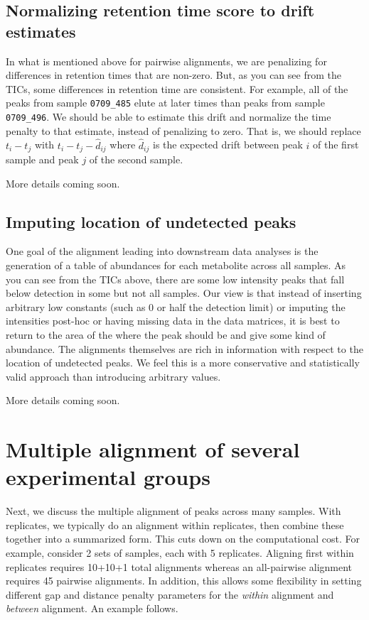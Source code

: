 \documentclass{article}\usepackage[]{graphicx}\usepackage[]{color}
\begin{document}
\subsection{Normalizing retention time score to drift estimates}
In what is mentioned above for pairwise alignments, we are penalizing
for differences in retention times that are non-zero. But, as you can
see from the TICs, some differences in retention time are
consistent. For example, all of the peaks from sample
\texttt{0709\_485} elute at later times than peaks from sample
\texttt{0709\_496}. We should be able to estimate this drift and
normalize the time penalty to that estimate, instead of penalizing to
zero. That is, we should replace $t_i-t_j$ with $t_i-t_j-\hat{d}_{ij}$
where $\hat{d}_{ij}$ is the expected drift between peak $i$ of the
first sample and peak $j$ of the second sample. 

More details coming soon.


\subsection{Imputing location of undetected peaks}
One goal of the alignment leading into downstream data analyses is the
generation of a table of abundances for each metabolite across all
samples. As you can see from the TICs above, there are some low
intensity peaks that fall below detection in some but not all
samples. Our view is that instead of inserting arbitrary low constants
(such as 0 or half the detection limit) or imputing the intensities
post-hoc or having missing data in the data matrices, it is best to
return to the area of the where the peak should be and give some kind
of abundance. The alignments themselves are rich in information with
respect to the location of undetected peaks. We feel this is a more
conservative and statistically valid approach than introducing
arbitrary values. 

More details coming soon.


\section{Multiple alignment of several experimental groups}
Next, we discuss the multiple alignment of peaks across many
samples. With replicates, we typically do an alignment within
replicates, then combine these together into a summarized form. This
cuts down on the computational cost. For example, consider 2 sets of
samples, each with 5 replicates. Aligning first within replicates
requires 10+10+1 total alignments whereas an all-pairwise alignment
requires 45 pairwise alignments. In addition, this allows some
flexibility in setting different gap and distance penalty parameters
for the {\em within} alignment and {\em between} alignment. An
example follows. 
\end{document}
